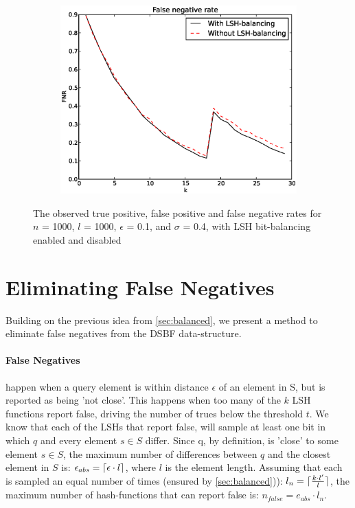 \documentclass[a4paper,11pt]{article}
\DeclarePairedDelimiter{\ceil}{\lceil}{\rceil}
\begin{document}
\begin{figure}[H]
\begin{subfigure}{.5\textwidth}
  \includegraphics[width=.95\linewidth]{bitbalancing_FNR1}
\end{subfigure}
\caption{The observed true positive, false positive and false negative rates for $n$ = 1000, $l$ = 1000, $\epsilon$ = 0.1, and $\sigma$ = 0.4, with LSH bit-balancing enabled and disabled}
\label{fig:bitbalance-fpnr}
\end{figure}


\section{Eliminating False Negatives}
Building on the previous idea from \ref{sec:balanced}, we present a method to eliminate false negatives from the DSBF data-structure.

\paragraph{False Negatives} \label{p:fn}happen when a query element is within distance $\epsilon$ of an element in S, but is reported as being 'not close'. This happens when too many of the $k$ LSH functions report false, driving the number of trues below the threshold $t$. We know that each of the LSHs that report false, will sample at least one bit in which $q$ and every element $s \in S$ differ. Since q, by definition, is 'close' to some element $s \in S$, the maximum number of differences between $q$ and the closest element in $S$ is: $\epsilon_{abs} = \ceil{\epsilon \cdot l}$, where $l$ is the element length. Assuming that each is sampled an equal number of times (ensured by \ref{sec:balanced})): $l_n = \ceil{\frac{k \cdot l{'}}{l}}$, the maximum number of hash-functions that can report false is: $n_{false} = e_{abs} \cdot l_n$.
\end{document}
